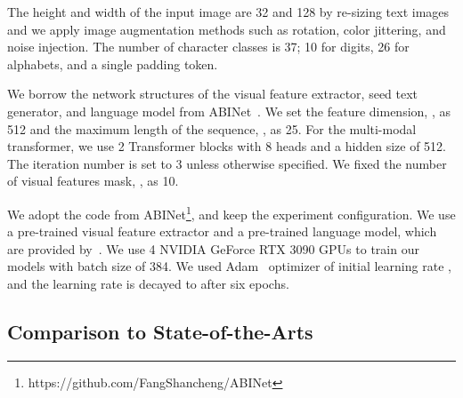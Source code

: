 \documentclass[runningheads]{llncs}
\begin{document}
The height and width of the input image are 32 and 128 by re-sizing text images and we apply image augmentation methods \cite{ABINet,lyu2018mask,Yu_2020_CVPR_SRN} such as rotation, color jittering, and noise injection. The number of character classes is 37; 10 for digits, 26 for alphabets, and a single padding token.

We borrow the network structures of the visual feature extractor, seed text generator, and language model from ABINet~\cite{ABINet}. We set the feature dimension, , as 512 and the maximum length of the sequence, , as 25. For the multi-modal transformer, we use 2 Transformer blocks with 8 heads and a hidden size of 512. The iteration number  is set to 3 unless otherwise specified. We fixed the number of visual features mask, , as 10.

We adopt the code from ABINet\footnote{https://github.com/FangShancheng/ABINet}, and keep the experiment configuration. We use a pre-trained visual feature extractor and a pre-trained language model, which are provided by~\cite{ABINet}. We use 4 NVIDIA GeForce RTX 3090 GPUs to train our models with batch size of 384. We used Adam~\cite{Adam} optimizer of initial learning rate , and the learning rate is decayed to   after six epochs.

\subsection{Comparison to State-of-the-Arts}
\end{document}
